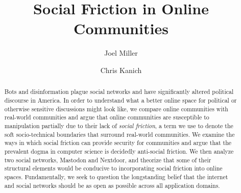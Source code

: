 \documentclass[sigconf,authordraft]{acmart}
\begin{document}
\title{Social Friction in Online Communities}

%

\author{Joel Miller}

\author{Chris Kanich}












\begin{abstract}
Bots and disinformation plague social networks and have significantly altered political discourse in America. In order to understand what a better online space for political or otherwise sensitive discussions might look like, we compare online communities with real-world communities and argue that online communities are susceptible to manipulation partially due to their lack of {\itshape social friction}, a term we use to denote the soft socio-technical boundaries that surround real-world communities. We examine the ways in which social friction can provide security for communities and argue that the prevalent dogma in computer science is decidedly anti-social friction. We then analyze two social networks, Mastodon and Nextdoor, and theorize that some of their structural elements would be conducive to incorporating social friction into online spaces. Fundamentally, we seek to question the longstanding belief that the internet and social networks should be as open as possible across all application domains.
\end{abstract}
\end{document}
